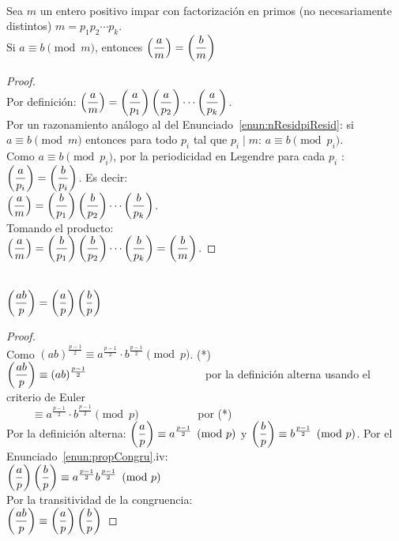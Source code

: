 \begin{enunciado} \, \\
Sea $m$ un entero positivo impar con factorización en primos (no necesariamente distintos) $m=p_1p_2\cdots p_k$. \\
Si $a \equiv b \pmod {m}$, entonces $\left(\dfrac{a}{m}\right) = \left(\dfrac{b}{m}\right)$
\end{enunciado}

\begin{proof} \, \\
Por definición: $\left(\dfrac{a}{m}\right) = \left(\dfrac{a}{p_1}\right) \left(\dfrac{a}{p_2}\right) \cdots \left(\dfrac{a}{p_k}\right)$. \\
Por un razonamiento análogo al del Enunciado~\ref{enun:nResidpiResid}: si  $a \equiv b \pmod {m}$ entonces para todo $p_i$ tal que $p_i \mid m$: $a \equiv b \pmod {p_i}$. \\
Como $a \equiv b \pmod {p_i}$, por la periodicidad en Legendre para cada $p_i$ : $\left(\dfrac{a}{p_i}\right) = \left(\dfrac{b}{p_i}\right)$. Es decir: \\
$\left(\dfrac{a}{m}\right) = \left(\dfrac{b}{p_1}\right) \left(\dfrac{b}{p_2}\right) \cdots \left(\dfrac{b}{p_k}\right)$. \\
Tomando el producto: \\
$\left(\dfrac{a}{m}\right)= \left(\dfrac{b}{p_1}\right) \left(\dfrac{b}{p_2}\right) \cdots \left(\dfrac{b}{p_k}\right) =\left(\dfrac{b}{m}\right)$. 
\end{proof}

\begin{enunciado} \, \\
$\left(\dfrac{ab}{p}\right) = \left(\dfrac{a}{p}\right) \left(\dfrac{b}{p}\right)$
\end{enunciado}

\begin{proof} \, \\
Como $(ab)^{\frac{p-1}{2}} \equiv a^{\frac{p-1}{2}} \cdot b^{\frac{p-1}{2}} \pmod{p}$. \hfill (*) \\
$\left(\dfrac{ab}{p}\right) \equiv (ab)^{\frac{p-1}{2}} \qquad \qquad \qquad \qquad \qquad \;$ por la definición alterna usando el criterio de Euler \\
${}\qquad \; \equiv a^{\frac{p-1}{2}} \cdot b^{\frac{p-1}{2}} \pmod{p} \qquad \qquad \quad$ por (*) \\
Por la definición alterna: $\left(\dfrac{a}{p}\right) \equiv a^{\frac{p-1}{2}} \pmod p$ y $\left(\dfrac{b}{p}\right) \equiv b^{\frac{p-1}{2}} \pmod p$. Por el Enunciado~\ref{enun:propCongru}.iv: \\
$\left(\dfrac{a}{p}\right) \left(\dfrac{b}{p}\right) \equiv a^{\frac{p-1}{2}} b^{\frac{p-1}{2}} \pmod p$ \\
Por la transitividad de la congruencia: \\
$\left(\dfrac{ab}{p}\right) \equiv \left(\dfrac{a}{p}\right) \left(\dfrac{b}{p}\right)$
\end{proof}

